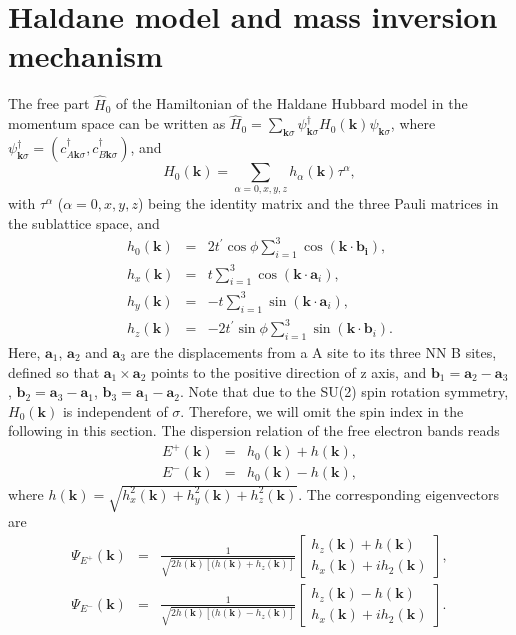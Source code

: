 \documentclass[amsmath,superscriptaddress,showpacs,aps,prl,twocolumn]{revtex4-1}
\begin{document}
\section{Haldane model and mass inversion mechanism}
\par The free part $\hat{H}_0$ of the Hamiltonian of the Haldane Hubbard model in the momentum space can be written as $\hat{H}_0=\sum_{\mathbf{k}\sigma}\psi^{\dagger}_{\mathbf{k}\sigma}H_0(\mathbf{k})\psi_{\mathbf{k}\sigma}$, where $\psi^{\dagger}_{\mathbf{k}\sigma}=(c^{\dagger}_{A\mathbf{k}\sigma},c^{\dagger}_{B\mathbf{k}\sigma})$, and
\begin{equation}\label{H0k}
H_0(\mathbf{k})=\sum_{\alpha=0,x,y,z}h_\alpha(\mathbf{k})\tau^\alpha,
\end{equation}
with $\tau^\alpha$ ($\alpha=0,x,y,z$) being the identity matrix and the three Pauli matrices in the sublattice space, and
\begin{eqnarray*}
h_0(\mathbf{k})&=&2t^\prime\cos\phi\sum_{i=1}^3\cos(\mathbf{k}\cdot\mathbf{b_i}), \\
h_x(\mathbf{k})&=&t\sum_{i=1}^3\cos(\mathbf{k}\cdot\mathbf{a}_i), \\
h_y(\mathbf{k})&=&-t\sum_{i=1}^3\sin(\mathbf{k}\cdot\mathbf{a}_i), \\
h_z(\mathbf{k})&=&-2t^\prime\sin\phi\sum_{i=1}^3\sin(\mathbf{k}\cdot\mathbf{b}_i).
\end{eqnarray*}
Here, $\mathbf{a}_1$, $\mathbf{a}_2$ and $\mathbf{a}_3$ are the displacements from a A site to its three NN B sites, defined so that $\mathbf{a}_1\times\mathbf{a}_2$ points to the positive direction of z axis, and $\mathbf{b}_1=\mathbf{a}_2-\mathbf{a}_3$, $\mathbf{b}_2=\mathbf{a}_3-\mathbf{a}_1$, $\mathbf{b}_3=\mathbf{a}_1-\mathbf{a}_2$. Note that due to the SU(2) spin rotation symmetry, $H_0(\mathbf{k})$ is independent of $\sigma$. Therefore, we will omit the spin index in the following in this section. The dispersion relation of the free electron bands reads
\begin{eqnarray*}
E^+(\mathbf{k})&=& h_0(\mathbf{k})+h(\mathbf{k}), \\
E^-(\mathbf{k})&=& h_0(\mathbf{k})-h(\mathbf{k}),
\end{eqnarray*}
where $h(\mathbf{k})=\sqrt{h^2_x(\mathbf{k})+h^2_y(\mathbf{k})+h^2_z(\mathbf{k})}$. The corresponding eigenvectors are
\begin{eqnarray}
\Psi_{E^+}(\mathbf{k})&=& \frac{1}{\sqrt{2h(\mathbf{k})\left[(h(\mathbf{k})+h_z(\mathbf{k})\right]}}
\begin{bmatrix}
h_z(\mathbf{k})+h(\mathbf{k}) \\
h_x(\mathbf{k})+ih_2(\mathbf{k})
\end{bmatrix},
\label{PsaiP}\\
\Psi_{E^-}(\mathbf{k})&=& \frac{1}{\sqrt{2h(\mathbf{k})\left[(h(\mathbf{k})-h_z(\mathbf{k})\right]}}
\begin{bmatrix}
h_z(\mathbf{k})-h(\mathbf{k})\\
h_x(\mathbf{k})+ih_2(\mathbf{k})
\end{bmatrix}\label{PsaiM}.
\end{eqnarray}
\end{document}

